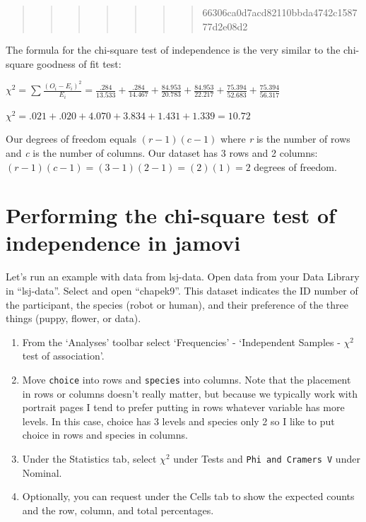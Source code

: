 \documentclass[
]{book}
\begin{document}
\begin{quote}
\begin{quote}
\begin{quote}
\begin{quote}
\begin{quote}
\begin{quote}
\begin{quote}
66306ca0d7acd82110bbda4742c158777d2e08d2
\end{quote}
\end{quote}
\end{quote}
\end{quote}
\end{quote}
\end{quote}
\end{quote}

The formula for the chi-square test of independence is the very similar to the chi-square goodness of fit test:

\(\chi^2 = \sum{\frac{(O_i-E_i)^2}{E_i}} = \frac{.284}{13.533} + \frac{.284}{14.467} + \frac{84.953}{20.783} + \frac{84.953}{22.217} + \frac{75.394}{52.683} + \frac{75.394}{56.317}\)

\(\chi^2 = .021 + .020 + 4.070 + 3.834 + 1.431 + 1.339 = 10.72\)

Our degrees of freedom equals \((r-1)(c-1)\) where \emph{r} is the number of rows and \emph{c} is the number of columns. Our dataset has 3 rows and 2 columns: \((r-1)(c-1) = (3-1)(2-1) = (2)(1) = 2\) degrees of freedom.

\hypertarget{performing-the-chi-square-test-of-independence-in-jamovi}{%
\section{Performing the chi-square test of independence in jamovi}\label{performing-the-chi-square-test-of-independence-in-jamovi}}

Let's run an example with data from lsj-data. Open data from your Data Library in ``lsj-data''. Select and open ``chapek9''. This dataset indicates the ID number of the participant, the species (robot or human), and their preference of the three things (puppy, flower, or data).

\begin{enumerate}
\def\labelenumi{\arabic{enumi}.}
\item
  From the `Analyses' toolbar select `Frequencies' - `Independent Samples - \(\chi^2\) test of association'.
\item
  Move \texttt{choice} into rows and \texttt{species} into columns. Note that the placement in rows or columns doesn't really matter, but because we typically work with portrait pages I tend to prefer putting in rows whatever variable has more levels. In this case, choice has 3 levels and species only 2 so I like to put choice in rows and species in columns.
\item
  Under the Statistics tab, select \(\chi^2\) under Tests and \texttt{Phi\ and\ Cramer\textquotesingle{}s\ V} under Nominal.
\item
  Optionally, you can request under the Cells tab to show the expected counts and the row, column, and total percentages.
\end{enumerate}
\end{document}
